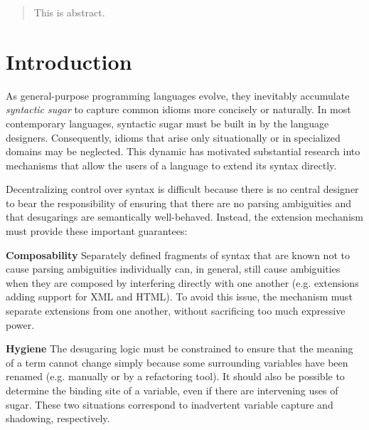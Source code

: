 \documentclass{sig-alternate}
\begin{document}
\maketitle
\begin{abstract}
This is abstract.
\end{abstract}


\section{Introduction}
As general-purpose programming languages evolve, they inevitably accumulate \emph{syntactic sugar} to capture common idioms more concisely or naturally. In most contemporary languages, syntactic sugar must be built in by the language designers. Consequently, idioms that arise only situationally or in specialized domains may be neglected. This dynamic has motivated substantial research into mechanisms that allow the users of a language to extend its syntax directly. 

Decentralizing control over syntax is difficult because there is no central designer to bear the responsibility of ensuring that there are no parsing ambiguities and that desugarings are semantically well-behaved. Instead, the extension mechanism must provide these important guarantees:

\noindent
\textbf{Composability} Separately defined fragments of syntax that are known not to cause parsing ambiguities individually can, in general, still cause ambiguities when they are composed by interfering directly with one another (e.g. extensions adding support for XML and HTML). To avoid this issue, the mechanism must  separate extensions from one another, without sacrificing too much expressive power.

\noindent
\textbf{Hygiene} The desugaring logic  must be constrained to ensure that the meaning of a term cannot change simply because some surrounding variables have been renamed (e.g. manually or by a refactoring tool). It should also be possible to determine the binding site of a variable, even if there are intervening uses of sugar. These two situations correspond to inadvertent variable capture and shadowing, respectively. 
\end{document}
